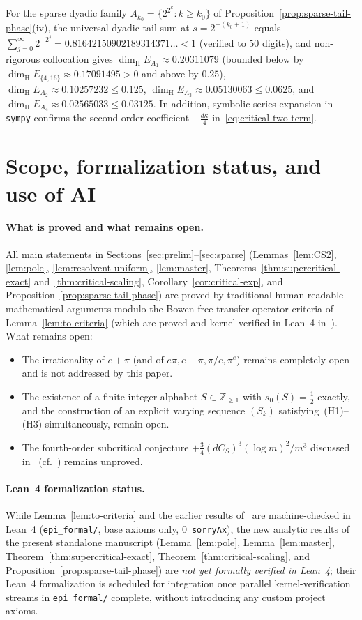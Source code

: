 \documentclass[11pt]{article}
\theoremstyle{definition}
\theoremstyle{remark}
\newcommand{\Z}{\mathbb{Z}}
\newcommand{\dimH}{\dim_{\mathrm{H}}}
\begin{document}
For the sparse dyadic family $A_{k_0}=\{2^{2^k}:k\ge k_0\}$ of
Proposition~\ref{prop:sparse-tail-phase}(iv), the universal dyadic tail sum
at $s=2^{-(k_0+1)}$ equals
$\sum_{j=0}^\infty 2^{-2^j}=0.81642150902189314371\dots<1$ (verified to $50$
digits), and non-rigorous collocation gives
$\dimH E_{A_1}\approx 0.20311079$ (bounded below by
$\dimH E_{\{4,16\}}\approx 0.17091495>0$ and above by $0.25$),
$\dimH E_{A_2}\approx 0.10257232\le 0.125$,
$\dimH E_{A_3}\approx 0.05130063\le 0.0625$, and
$\dimH E_{A_4}\approx 0.02565033\le 0.03125$.
In addition, symbolic series expansion in \texttt{sympy} confirms the
second-order coefficient $-\frac{d\kappa}{4}$ in~\eqref{eq:critical-two-term}.

\section{Scope, formalization status, and use of AI}\label{sec:scope}

\paragraph{What is proved and what remains open.}
All main statements in Sections~\ref{sec:prelim}--\ref{sec:sparse}
(Lemmas~\ref{lem:CS2}, \ref{lem:pole}, \ref{lem:resolvent-uniform},
\ref{lem:master}, Theorems~\ref{thm:supercritical-exact}
and~\ref{thm:critical-scaling}, Corollary~\ref{cor:critical-exp}, and
Proposition~\ref{prop:sparse-tail-phase}) are proved by traditional
human-readable mathematical arguments modulo the Bowen-free transfer-operator
criteria of Lemma~\ref{lem:to-criteria} (which are proved and kernel-verified
in Lean~4 in~\cite{Paper2}). What remains open:
\begin{itemize}[leftmargin=1.6em]
\item The irrationality of $e+\pi$ (and of $e\pi,e-\pi,\pi/e,\pi^e$) remains
completely open and is not addressed by this paper.
\item The existence of a finite integer alphabet $S\subset\Z_{\ge1}$ with
$s_0(S)=\frac12$ exactly, and the construction of an explicit varying
sequence $(S_k)$ satisfying~(H1)--(H3) simultaneously, remain open.
\item The fourth-order subcritical conjecture
$+\frac34(dC_S)^3(\log m)^2/m^3$ discussed in~\cite{Paper2} (cf.~\cite{DFSU})
remains unproved.
\end{itemize}

\paragraph{Lean~4 formalization status.}
While Lemma~\ref{lem:to-criteria} and the earlier results of~\cite{Paper2}
are machine-checked in Lean~4 (\texttt{epi\_formal/}, base axioms only,
$0$~\texttt{sorryAx}), the new analytic results of the present standalone
manuscript (Lemma~\ref{lem:pole}, Lemma~\ref{lem:master},
Theorem~\ref{thm:supercritical-exact}, Theorem~\ref{thm:critical-scaling},
and Proposition~\ref{prop:sparse-tail-phase}) are \emph{not yet formally
verified in Lean~4}; their Lean~4 formalization is scheduled for integration
once parallel kernel-verification streams in \texttt{epi\_formal/} complete,
without introducing any custom project axioms.
\end{document}
